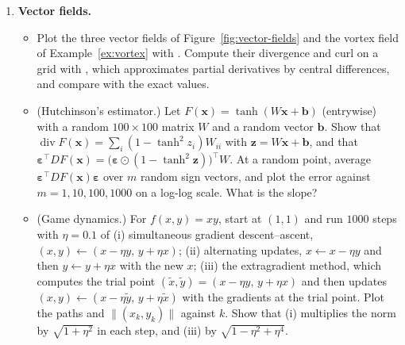 \documentclass[11pt]{article}
\newcommand{\py}[1]{\texttt{\detokenize{#1}}}
\newcommand{\norm}[1]{\lVert #1 \rVert}
\theoremstyle{definition}
\theoremstyle{plain}
\theoremstyle{remark}
\DeclareMathOperator{\Div}{div}
\begin{document}
\begin{enumerate}[label=\textbf{P\arabic*.}, leftmargin=*]
    \item \textbf{Vector fields.}
    \begin{itemize}
        \item Plot the three vector fields of Figure~\ref{fig:vector-fields} and the vortex field of Example~\ref{ex:vortex} with \py{plt.quiver}. Compute their divergence and curl on a grid with \py{np.gradient}, which approximates partial derivatives by central differences, and compare with the exact values.
        \item (Hutchinson's estimator.) Let $F(\mathbf{x}) = \tanh(W\mathbf{x} + \mathbf{b})$ (entrywise) with a random $100 \times 100$ matrix $W$ and a random vector $\mathbf{b}$. Show that $\Div F(\mathbf{x}) = \sum_i (1 - \tanh^2 z_i)W_{ii}$ with $\mathbf{z} = W\mathbf{x} + \mathbf{b}$, and that $\boldsymbol{\varepsilon}^\top DF(\mathbf{x}) = \big(\boldsymbol{\varepsilon} \odot (1 - \tanh^2\mathbf{z})\big)^\top W$. At a random point, average $\boldsymbol{\varepsilon}^\top DF(\mathbf{x})\boldsymbol{\varepsilon}$ over $m$ random sign vectors, and plot the error against $m = 1, 10, 100, 1000$ on a log-log scale. What is the slope?
        \item (Game dynamics.) For $f(x, y) = xy$, start at $(1, 1)$ and run $1000$ steps with $\eta = 0.1$ of (i) simultaneous gradient descent--ascent, $(x, y) \leftarrow (x - \eta y, \, y + \eta x)$; (ii) alternating updates, $x \leftarrow x - \eta y$ and then $y \leftarrow y + \eta x$ with the new $x$; (iii) the extragradient method, which computes the trial point $(\tilde x, \tilde y) = (x - \eta y, \, y + \eta x)$ and then updates $(x, y) \leftarrow (x - \eta\tilde y, \, y + \eta\tilde x)$ with the gradients at the trial point. Plot the paths and $\norm{(x_k, y_k)}$ against $k$. Show that (i) multiplies the norm by $\sqrt{1 + \eta^2}$ in each step, and (iii) by $\sqrt{1 - \eta^2 + \eta^4}$.
    \end{itemize}


\end{enumerate}
\end{document}
